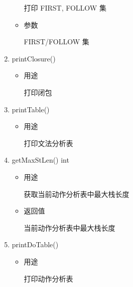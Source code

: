 \documentclass[fontset=none,UTF8,a4paper,zihao=-4]{ctexart}
\begin{document}
\begin{enumerate}
\begin{itemize}
打印 FIRST, FOLLOW 集

\item 参数

FIRST/FOLLOW 集
\end{itemize}

\item printClosure()

\begin{itemize}
\item 用途

打印闭包
\end{itemize}

\item printTable()

\begin{itemize}
\item 用途

打印文法分析表
\end{itemize}

\item getMaxStLen() int

\begin{itemize}
\item 用途

获取当前动作分析表中最大栈长度

\item 返回值

当前动作分析表中最大栈长度
\end{itemize}

\item printDoTable()

\begin{itemize}
\item 用途

打印动作分析表
\end{itemize}
\end{enumerate}
\end{document}
